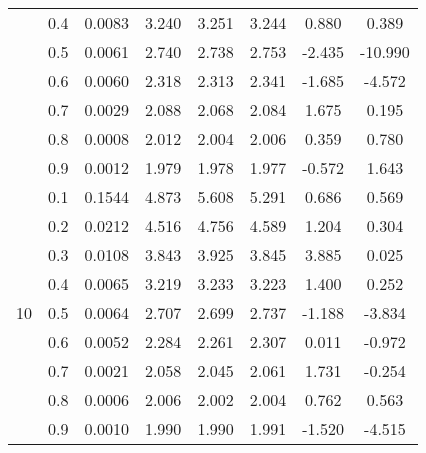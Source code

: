 \documentclass[11pt,a4paper]{report}
\begin{document}
\begin{longtable}{ | c | c || c | c | c | c | c | c | }
 & 0.4 & 0.0083 & 3.240 & 3.251 & 3.244 & 0.880 & 0.389 \\
 & 0.5 & 0.0061 & 2.740 & 2.738 & 2.753 & -2.435 & -10.990 \\
 & 0.6 & 0.0060 & 2.318 & 2.313 & 2.341 & -1.685 & -4.572 \\
 & 0.7 & 0.0029 & 2.088 & 2.068 & 2.084 & 1.675 & 0.195 \\
 & 0.8 & 0.0008 & 2.012 & 2.004 & 2.006 & 0.359 & 0.780 \\
 & 0.9 & 0.0012 & 1.979 & 1.978 & 1.977 & -0.572 & 1.643 \\
 \hline
\multirow{9}{*}{10} & 0.1 & 0.1544 & 4.873 & 5.608 & 5.291 & 0.686 & 0.569 \\
 & 0.2 & 0.0212 & 4.516 & 4.756 & 4.589 & 1.204 & 0.304 \\
 & 0.3 & 0.0108 & 3.843 & 3.925 & 3.845 & 3.885 & 0.025 \\
 & 0.4 & 0.0065 & 3.219 & 3.233 & 3.223 & 1.400 & 0.252 \\
 & 0.5 & 0.0064 & 2.707 & 2.699 & 2.737 & -1.188 & -3.834 \\
 & 0.6 & 0.0052 & 2.284 & 2.261 & 2.307 & 0.011 & -0.972 \\
 & 0.7 & 0.0021 & 2.058 & 2.045 & 2.061 & 1.731 & -0.254 \\
 & 0.8 & 0.0006 & 2.006 & 2.002 & 2.004 & 0.762 & 0.563 \\
 & 0.9 & 0.0010 & 1.990 & 1.990 & 1.991 & -1.520 & -4.515 \\
 \hline
\hline
\end{longtable}
\end{document}
